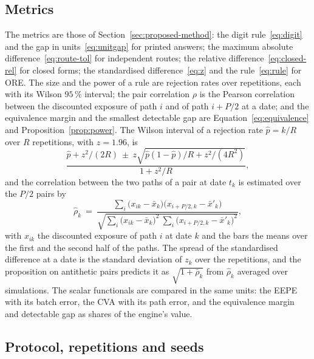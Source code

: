 \subsection{Metrics}
\label{sec:design-metrics}

The metrics are those of Section~\ref{sec:proposed-method}: the digit rule~\eqref{eq:digit} and the gap in units~\eqref{eq:unitgap} for printed answers; the maximum absolute difference~\eqref{eq:route-tol} for independent routes; the relative difference~\eqref{eq:closed-rel} for closed forms; the standardised difference~\eqref{eq:z} and the rule~\eqref{eq:rule} for ORE. The size and the power of a rule are rejection rates over repetitions, each with its Wilson $95\,\%$ interval; the pair correlation $\rho$ is the Pearson correlation between the discounted exposure of path $i$ and of path $i+P/2$ at a date; and the equivalence margin and the smallest detectable gap are Equation~\eqref{eq:equivalence} and Proposition~\ref{prop:power}. The Wilson interval of a rejection rate $\hat{p}=k/R$ over $R$ repetitions, with $z=1.96$, is
\begin{equation}
\frac{\hat{p}+z^{2}/(2R)\ \pm\ z\sqrt{\hat{p}(1-\hat{p})/R+z^{2}/(4R^{2})}}{1+z^{2}/R},
\label{eq:wilson}
\end{equation}
and the correlation between the two paths of a pair at date $t_k$ is estimated over the $P/2$ pairs by
\begin{equation}
\hat\rho_k\ =\ \frac{\sum_i\bigl(x_{ik}-\bar{x}_{k}\bigr)\bigl(x_{i+P/2,k}-\bar{x}'_{k}\bigr)}{\sqrt{\sum_i\bigl(x_{ik}-\bar{x}_{k}\bigr)^{2}\ \sum_i\bigl(x_{i+P/2,k}-\bar{x}'_{k}\bigr)^{2}}},
\label{eq:rho-hat}
\end{equation}
with $x_{ik}$ the discounted exposure of path $i$ at date $k$ and the bars the means over the first and the second half of the paths. The spread of the standardised difference at a date is the standard deviation of $z_k$ over the repetitions, and the proposition on antithetic pairs predicts it as $\sqrt{1+\bar\rho_k}$ from $\hat\rho_k$ averaged over simulations. The scalar functionals are compared in the same units: the EEPE with its batch error, the CVA with its path error, and the equivalence margin and detectable gap as shares of the engine's value.

\subsection{Protocol, repetitions and seeds}
\label{sec:design-protocol}

